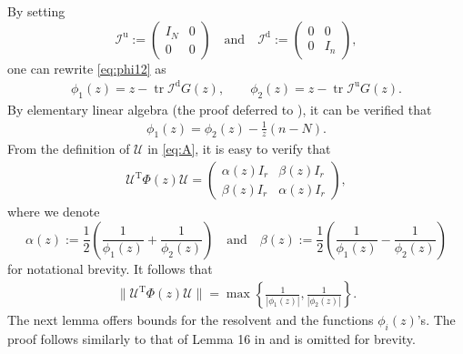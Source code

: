 \documentclass[reqno]{amsart}
\DeclareMathOperator{\tr}{tr}
\newcommand{\T}{\mathrm{T}}
\theoremstyle{plain}
\theoremstyle{definition}
\begin{document}
By setting 
\[
\mathcal I^\mathrm{u} := \begin{pmatrix}
I_N & 0\\
0& 0
\end{pmatrix} 
\quad\text{and}\quad
\mathcal I^\mathrm{d} := \begin{pmatrix}
0 & 0\\
0& I_n
\end{pmatrix},
 \]
one can rewrite \eqref{eq:phi12} as 
\begin{align}\label{eq:defphi}
\phi_1(z) = z - \tr \mathcal I^\mathrm{d} G(z), \qquad \phi_2(z) = z- \tr \mathcal I^\mathrm{u} G(z).
\end{align}
By elementary linear algebra (the proof deferred to \cite{WangSupp24}), it can be verified that
\begin{align}\label{eq:difference}
\phi_1(z) = \phi_2(z) - \frac{1}{z}(n-N).
\end{align}
From the definition of $ \mathcal U$ in \eqref{eq:A}, it is easy to verify that  
\begin{align}\label{eq:productPhi}
 \mathcal U^\T \Phi(z) \mathcal U = \begin{pmatrix}
\alpha(z) I_r & \beta(z) I_r\\
\beta(z) I_r & \alpha(z) I_r
\end{pmatrix}, 
\end{align}
where we denote $$\alpha(z):=\frac{1}{2}\left(\frac{1}{\phi_1(z)} + \frac{1}{\phi_2(z)} \right)\quad \text{and}\quad \beta(z):= \frac{1}{2}\left(\frac{1}{\phi_1(z)} - \frac{1}{\phi_2(z)} \right)$$ for notational brevity. 
It follows that 
\begin{align}\label{eq:Phinorm}
\|\mathcal U^\T \Phi(z) \mathcal U\| = \max \left\{\frac{1}{|\phi_1(z)|}, \frac{1}{|\phi_2(z)|} \right\}.
\end{align}
The next lemma offers bounds for the resolvent and the functions $\phi_i(z)$'s. The proof follows similarly to that of Lemma 16 in \cite{OVW22} and is omitted for brevity. 
\end{document}
